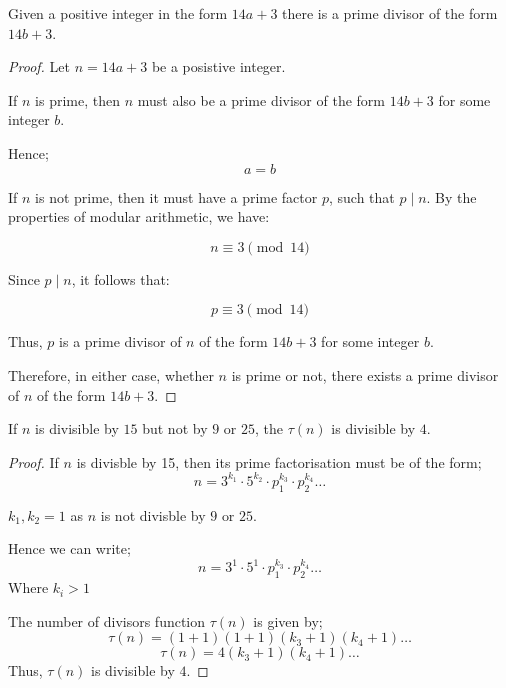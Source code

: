 \documentclass{tufte-handout}
\begin{document}
\begin{question}

Given a positive integer in the form \( 14a+3 \) there is a prime divisor of the form \( 14b+3 \).

\begin{proof}
Let \( n = 14a + 3 \) be a posistive integer.

If \( n \) is prime, then \( n \) must also be a prime divisor of the form \( 14b +3 \) for
some integer \( b \).

Hence;
\[ a = b \]

If \( n \) is not prime, then it must have a prime factor \( p \), such that \( p \mid n \).
By the properties of modular arithmetic, we have:

\[ n \equiv 3 \pmod 14 \]

Since \( p \mid n \), it follows that:

\[ p \equiv 3 \pmod 14 \]

Thus, \( p \) is a prime divisor of \( n \) of the form \( 14b + 3 \) for some integer \( b \).

Therefore, in either case, whether \( n \) is prime or not, there exists a prime divisor 
of \( n \) of the form \( 14b + 3 \).
\end{proof}

\end{question}


\begin{question}

  If \( n \) is divisible by \( 15 \) but not by \( 9 \text{ or } 25 \), the \( \tau(n) \)
  is divisible by \( 4 \).

\begin{proof}

If \( n \) is divisble by 15, then its prime factorisation must be of the form;
\[ n = 3^{k_1} \cdot 5^{k_2} \cdot p_1^{k_3} \cdot p_2^{k_4} \ldots \]

\( k_1, k_2 = 1 \) as \( n \) is not divisble by \( 9 \text{ or } 25 \).

Hence we can write;
\[ n = 3^1 \cdot 5^1 \cdot p_1^{k_3} \cdot p_2^{k_4} \ldots \]
Where \( k_i > 1 \)

The number of divisors function \( \tau(n) \) is given by;
\[ \tau(n) = (1+1)(1+1)(k_3 +1)(k_4 + 1) \ldots \]
\[ \tau(n) = 4(k_3 +1)(k_4 + 1) \ldots \]
Thus, \( \tau(n) \) is divisible by \( 4 \).

\end{proof}

\end{question}
\end{document}
